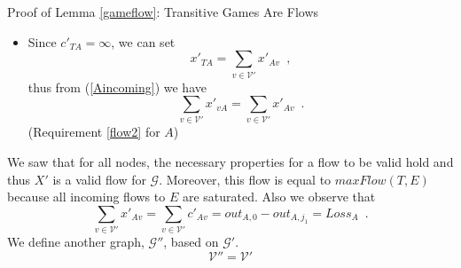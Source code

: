 \begin{sepproof}{Proof of Lemma \ref{gameflow}: Transitive Games Are Flows}
\begin{itemize}
\begin{equation*}
      x'_{Tv} = \left(out_{v, 0} - out_{v, j_1}\right) - \left(in_{v, 0} - in_{v, j_1}\right) \enspace.
    \end{equation*}
    In this way, we have
    \begin{equation*}
      \sum\limits_{w \in \mathcal{V}'}x'_{vw} = out_{v, 0} - out_{v, j_1} \mbox{ and}
    \end{equation*}
    \begin{equation*}
    \begin{gathered}
      \sum\limits_{w \in \mathcal{V}'}x'_{wv} = \sum\limits_{w \in \mathcal{V}' \setminus \{T\}}c'_{wv} + x'_{Tv} =
      in_{v, 0} - in_{v, j_1} + \\ + (out_{v, 0} - out_{v, j_1}) - (in_{v, 0} - in_{v, j_1}) = out_{v, 0} -
      out_{v, j_1} \enspace.
    \end{gathered}
    \end{equation*}
    thus
    \begin{equation*}
      \sum\limits_{w \in \mathcal{V}'}x'_{vw} = \sum\limits_{w \in \mathcal{V}'}x'_{wv} \enspace.
    \end{equation*}
    (Requirement \ref{flow2} $\forall v \in Sad_{j_1}$)
    \item Since $c'_{TA} = \infty$, we can set
    \begin{equation*}
      x'_{TA} = \sum\limits_{v \in \mathcal{V}'}x'_{Av} \enspace,
    \end{equation*}
    thus from (\ref{Aincoming}) we have
    \begin{equation*}
      \sum\limits_{v \in \mathcal{V}'}x'_{vA} = \sum\limits_{v \in \mathcal{V}'}x'_{Av} \enspace.
    \end{equation*}
    (Requirement \ref{flow2} for $A$)
  \end{itemize}
  We saw that for all nodes, the necessary properties for a flow to be valid hold and thus $X'$ is a valid flow for
  $\mathcal{G}$. Moreover, this flow is equal to $maxFlow(T, E)$ because all incoming flows to $E$ are saturated.
  Also we observe that
  \begin{equation}
  \label{xprimeequalloss}
    \sum\limits_{v \in \mathcal{V}'}x'_{Av} = \sum\limits_{v \in \mathcal{V}'}c'_{Av} = out_{A, 0} - out_{A, j_1} =
    Loss_A \enspace.
  \end{equation}
  We define another graph, $\mathcal{G}''$, based on $\mathcal{G}'$.
  \begin{equation*}
    \mathcal{V}'' = \mathcal{V}'
  \end{equation*}
  \begin{equation*}

\end{equation*}
\end{sepproof}
